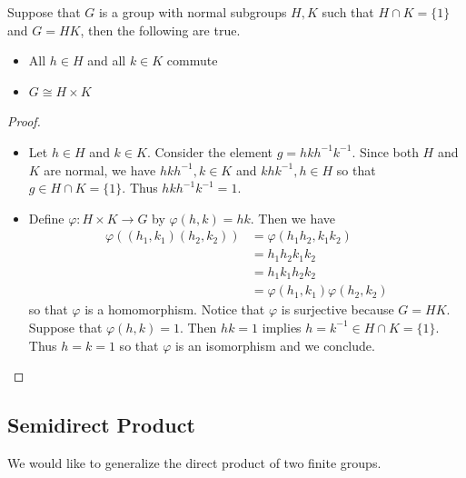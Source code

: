 \documentclass[a4paper]{article}
\begin{document}
\begin{thm}{}{} Suppose that $G$ is a group with normal subgroups $H,K$ such that $H\cap K=\{1\}$ and $G=HK$, then the following are true. 
\begin{itemize}
\item All $h\in H$ and all $k\in K$ commute
\item $G\cong H\times K$
\end{itemize} \tcbline
\begin{proof}~\\
\begin{itemize}
\item Let $h\in H$ and $k\in K$. Consider the element $g=hkh^{-1}k^{-1}$. Since both $H$ and $K$ are normal, we have $hkh^{-1},k\in K$ and $khk^{-1},h\in H$ so that $g\in H\cap K=\{1\}$. Thus $hkh^{-1}k^{-1}=1$. 
\item Define $\varphi:H\times K\to G$ by $\varphi(h,k)=hk$. Then we have 
\begin{align*}
\varphi((h_1,k_1)(h_2,k_2))&=\varphi(h_1h_2,k_1k_2)\\
&=h_1h_2k_1k_2\\
&=h_1k_1h_2k_2\\
&=\varphi(h_1,k_1)\varphi(h_2,k_2)
\end{align*}
so that $\varphi$ is a homomorphism. Notice that $\varphi$ is surjective because $G=HK$. Suppose that $\varphi(h,k)=1$. Then $hk=1$ implies $h=k^{-1}\in H\cap K=\{1\}$. Thus $h=k=1$ so that $\varphi$ is an isomorphism and we conclude. 
\end{itemize}
\end{proof}
\end{thm}

\subsection{Semidirect Product}
We would like to generalize the direct product of two finite groups. 
\end{document}
